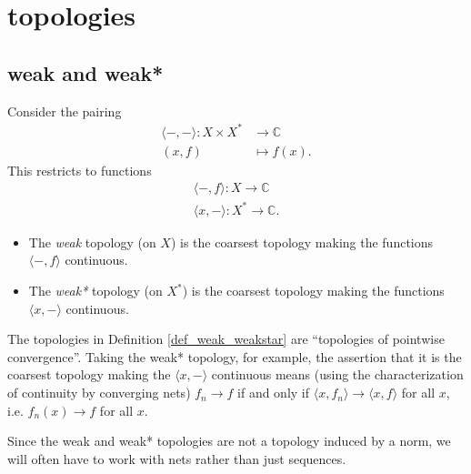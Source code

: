 \documentclass[12pt]{article}
\begin{document}
\section{topologies} %
\begin{refsection}

\subsection{weak and weak*} %

Consider the pairing
\begin{align*}
	\langle -, -\rangle : X\times X^\ast &\to \mathbb{C} \\
	(x,f) &\mapsto f(x).
\end{align*}
This restricts to functions 
\begin{gather*}
	\langle -, f\rangle: X \to \mathbb{C} \\
	\langle x, -\rangle: X^\ast \to \mathbb{C}.
\end{gather*}

\begin{definition}
\label{def_weak_weakstar}
	\hfill
	\begin{itemize}
		\item The \emph{weak} topology (on $X$) is the coarsest topology making the functions $\langle -, f\rangle$ continuous.
		\item The \emph{weak*} topology (on $X^\ast$) is the coarsest topology making the functions $\langle x, -\rangle$ continuous.
	\end{itemize}
\end{definition}

\begin{remark}
\label{rmk_weak_is_pointwise}
	The topologies in Definition \ref{def_weak_weakstar} are ``topologies of pointwise convergence''. Taking the weak* topology, for example, the assertion that it is the coarsest topology making the $\langle x, -\rangle$ continuous means (using the characterization of continuity by converging nets) $f_n\to f$ if and only if $\langle x, f_n\rangle \to \langle x, f\rangle$ for all $x$, i.e. $f_n(x)\to f$ for all $x$.
\end{remark}

\begin{remark}
	Since the weak and weak* topologies are not a topology induced by a norm, we will often have to work with nets rather than just sequences.
\end{remark}



\end{refsection}
\end{document}
